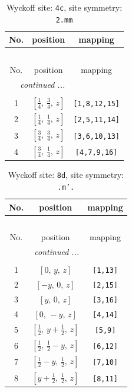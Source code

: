 \documentclass[fleqn,8pt]{jsarticle}
\begin{document}
\renewcommand{\arraystretch}{1.2}
\begin{longtable}{ccc}
\caption{Wyckoff site: {\tt 4c}, site symmetry: {\tt 2.mm}}
 \\
 \hline \hline
No. & position & mapping \\ \hline \endfirsthead

\multicolumn{2}{l}{\tablename\ \thetable{}} \\
 \hline \hline
No. & position & mapping \\ \hline \endhead

 \hline \hline
\multicolumn{2}{r}{\footnotesize\it continued ...} \\ \endfoot

 \hline \hline
\multicolumn{2}{r}{} \\ \endlastfoot

1 & $\left[ \frac{1}{4},\, \frac{3}{4},\, z \right]$ & {\tt [1,8,12,15]} \\ \hline
2 & $\left[ \frac{1}{4},\, \frac{1}{4},\, z \right]$ & {\tt [2,5,11,14]} \\ \hline
3 & $\left[ \frac{3}{4},\, \frac{3}{4},\, z \right]$ & {\tt [3,6,10,13]} \\ \hline
4 & $\left[ \frac{3}{4},\, \frac{1}{4},\, z \right]$ & {\tt [4,7,9,16]} \\
\end{longtable}
\renewcommand{\arraystretch}{1.2}
\begin{longtable}{ccc}
\caption{Wyckoff site: {\tt 8d}, site symmetry: {\tt .m'.}}
 \\
 \hline \hline
No. & position & mapping \\ \hline \endfirsthead

\multicolumn{2}{l}{\tablename\ \thetable{}} \\
 \hline \hline
No. & position & mapping \\ \hline \endhead

 \hline \hline
\multicolumn{2}{r}{\footnotesize\it continued ...} \\ \endfoot

 \hline \hline
\multicolumn{2}{r}{} \\ \endlastfoot

1 & $\left[ 0,\, y,\, z \right]$ & {\tt [1,13]} \\ \hline
2 & $\left[ - y,\, 0,\, z \right]$ & {\tt [2,15]} \\ \hline
3 & $\left[ y,\, 0,\, z \right]$ & {\tt [3,16]} \\ \hline
4 & $\left[ 0,\, - y,\, z \right]$ & {\tt [4,14]} \\ \hline
5 & $\left[ \frac{1}{2},\, y + \frac{1}{2},\, z \right]$ & {\tt [5,9]} \\ \hline
6 & $\left[ \frac{1}{2},\, \frac{1}{2} - y,\, z \right]$ & {\tt [6,12]} \\ \hline
7 & $\left[ \frac{1}{2} - y,\, \frac{1}{2},\, z \right]$ & {\tt [7,10]} \\ \hline
8 & $\left[ y + \frac{1}{2},\, \frac{1}{2},\, z \right]$ & {\tt [8,11]} \\
\end{longtable}
\end{document}
